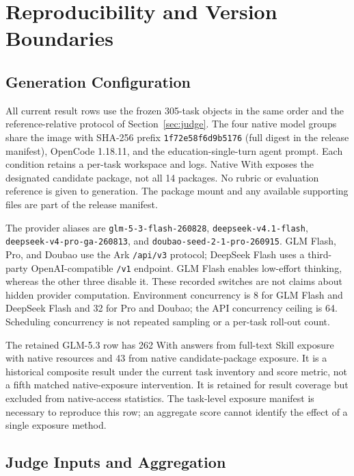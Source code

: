\section{Reproducibility and Version Boundaries}
\label{app:execution}

\subsection{Generation Configuration}

All current result rows use the frozen 305-task objects in the same order and
the reference-relative protocol of Section~\ref{sec:judge}. The four native
model groups share the image with SHA-256 prefix
\texttt{1f72e58f6d9b5176} (full digest in the release manifest),
OpenCode 1.18.11, and the education-single-turn agent prompt. Each condition
retains a per-task workspace and logs. Native With exposes the designated
candidate package, not all 14 packages. No rubric or evaluation reference is
given to generation. The package mount and any available supporting files are
part of the release manifest.

The provider aliases are \texttt{glm-5-3-flash-260828},
\texttt{deepseek-v4.1-flash}, \texttt{deepseek-v4-pro-ga-260813}, and
\texttt{doubao-seed-2-1-pro-260915}. GLM Flash, Pro, and Doubao use the Ark
\texttt{/api/v3} protocol; DeepSeek Flash uses a third-party OpenAI-compatible
\texttt{/v1} endpoint. GLM Flash enables low-effort thinking, whereas the other
three disable it. These recorded switches are not claims about hidden provider
computation. Environment concurrency is 8 for GLM Flash and DeepSeek Flash and
32 for Pro and Doubao; the API concurrency ceiling is 64. Scheduling
concurrency is not repeated sampling or a per-task roll-out count.

The retained GLM-5.3 row has 262 With answers from full-text Skill exposure
with native resources and 43 from native candidate-package exposure. It is a
historical composite result under the current task inventory and score metric,
not a fifth matched native-exposure intervention. It is retained for result
coverage but excluded from native-access statistics. The task-level exposure
manifest is necessary to reproduce this row; an aggregate score cannot identify
the effect of a single exposure method.

\subsection{Judge Inputs and Aggregation}

